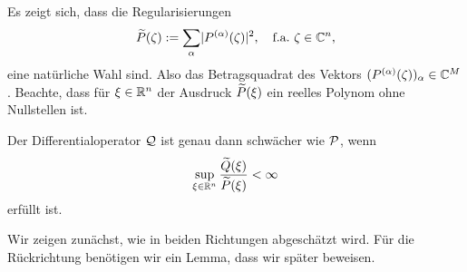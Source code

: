 Es zeigt sich, dass die Regularisierungen
\begin{equation}\label{eq:2:2}
\widetilde{P}(\zeta):=\sum_\alpha\lvert P^{(\alpha)}(\zeta)\rvert^2,
\quad\text{f.a.}~\zeta\in\mathbb C^n,
\end{equation}
eine natürliche Wahl sind.
Also das Betragsquadrat des Vektors $(P^{(\alpha)}(\zeta))_\alpha\in\mathbb C^M$.
Beachte, dass für $\xi\in\mathbb R^n$ der Ausdruck
$\widetilde{P}(\xi)$ ein reelles Polynom ohne Nullstellen ist.

\begin{thm}\label{thm:2:2.1}
Der Differentialoperator $\mathcal Q$ ist genau dann schwächer wie $\mathcal P$,
wenn
\begin{equation}\label{eq:thm:2:2.1}
\sup_{\xi\in\mathbb R^n}\frac{\widetilde{Q}(\xi)}{\widetilde{P}(\xi)}<\infty
\end{equation}
erfüllt ist.
\end{thm}

Wir zeigen zunächst, wie in beiden Richtungen abgeschätzt wird.
Für die Rückrichtung benötigen wir ein Lemma,
dass wir später beweisen.

